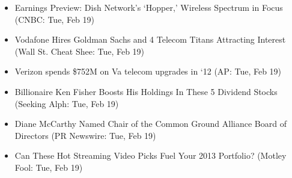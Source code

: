 \documentclass[11pt,asymmetric]{article}
\begin{document}
\begin{itemize}
\item Earnings Preview: Dish Network's `Hopper,' Wireless Spectrum in Focus (CNBC: Tue, Feb 19)
\item Vodafone Hires Goldman Sachs and 4 Telecom Titans Attracting Interest (Wall St. Cheat Shee: Tue, Feb 19)
\item Verizon spends \$752M on Va telecom upgrades in `12 (AP: Tue, Feb 19)
\item Billionaire Ken Fisher Boosts His Holdings In These 5 Dividend Stocks (Seeking Alph: Tue, Feb 19)
\item Diane McCarthy Named Chair of the Common Ground Alliance Board of Directors (PR Newswire: Tue, Feb 19)
\item Can These Hot Streaming Video Picks Fuel Your 2013 Portfolio? (Motley Fool: Tue, Feb 19)
\end{itemize}
\end{document}
